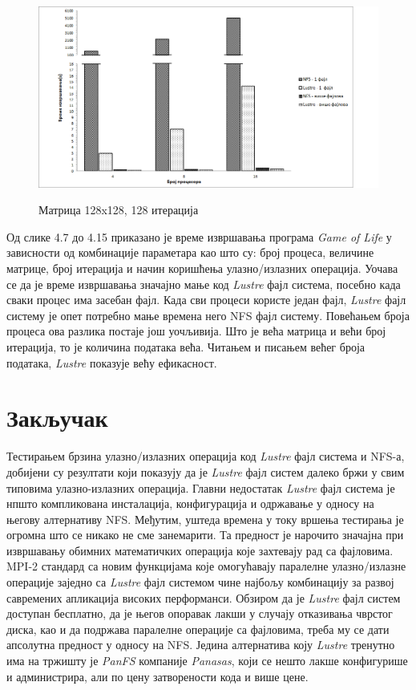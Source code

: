       \begin{figure}[H]
        \centering
            \includegraphics[width=1\textwidth]{slike/results/128_128.png}\\[1cm]
       \caption{Матрица 128x128, 128 итерација}
      \end{figure}
  
Од слике 4.7 до 4.15 приказано је време извршавања програма \textit{Game of Life} у зависности од комбинације параметара као што су: број процеса, величине матрице, број итерација и начин коришћења улазно/излазних операција. Уочава се да је време извршавања значајно мање код \textit{Lustre} фајл система, посебно када сваки процес има засебан фајл. Када сви процеси користе један фајл, \textit{Lustre} фајл систему је опет потребно мање времена него NFS фајл систему. Повећањем броја процеса ова разлика постаје још уочљивија. 
Што је већа матрица и већи број итерација, то је количина података већа. Читањем и писањем већег броја података, \textit{Lustre} показује већу ефикасност. 
  
    
\chapter{Закључак}     


 Тестирањем брзина улазно/излазних операција код \textit{Lustre} фајл система и NFS-а, добијени су резултати који показују да је  \textit{Lustre} фајл систем далеко бржи у свим типовима улазно-излазних операција. Главни недостатак \textit{Lustre} фајл система је нпшто компликована инсталација, конфигурација и одржавање у односу на његову алтернативу NFS. Међутим, уштеда времена у току вршења тестирања је огромна што се никако не сме занемарити. Та предност је нарочито значајна при извршавању обимних математичких операција које захтевају рад са фајловима. MPI-2 стандард са новим функцијама које омогућавају паралелне улазно/излазне операције заједно са \textit{Lustre} фајл системом чине најбољу комбинацију за развој савремених апликација високих перформанси. Обзиром да је \textit{Lustre} фајл систем доступан бесплатно, да је његов опоравак лакши у случају отказивања чврстог диска, као и да подржава паралелне операције са фајловима, треба му се дати апсолутна предност у односу на NFS. Једина алтернатива коју \textit{Lustre} тренутно има на тржишту је \textit{PanFS} компаније \textit{Panasas}, који се нешто лакше конфигурише и администрира, али по цену затворености кода и више цене. 
 
